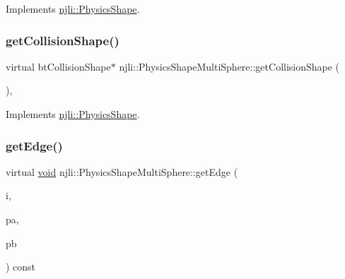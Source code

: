 Implements \mbox{\hyperlink{classnjli_1_1_physics_shape_a527e956caca24bf16ed0d47f69ff14e8}{njli\+::\+Physics\+Shape}}.

\mbox{\label{classnjli_1_1_physics_shape_multi_sphere_a591dec07102b432fbced1b4bfd093512}} 
\subsubsection{\texorpdfstring{get\+Collision\+Shape()}{getCollisionShape()}\hspace{0.1cm}{\footnotesize\ttfamily [2/2]}}
{\footnotesize\ttfamily virtual bt\+Collision\+Shape$\ast$ njli\+::\+Physics\+Shape\+Multi\+Sphere\+::get\+Collision\+Shape (\begin{DoxyParamCaption}{ }\end{DoxyParamCaption})\hspace{0.3cm}{\ttfamily [protected]}, {\ttfamily [virtual]}}



Implements \mbox{\hyperlink{classnjli_1_1_physics_shape_a2910f0362035c971f245349a55378b01}{njli\+::\+Physics\+Shape}}.

\mbox{\label{classnjli_1_1_physics_shape_multi_sphere_a4bf4fdd81dfddc61b0c40adf04bdddde}} 
\subsubsection{\texorpdfstring{get\+Edge()}{getEdge()}}
{\footnotesize\ttfamily virtual \mbox{\hyperlink{_thread_8h_af1e856da2e658414cb2456cb6f7ebc66}{void}} njli\+::\+Physics\+Shape\+Multi\+Sphere\+::get\+Edge (\begin{DoxyParamCaption}\item[{int}]{i,  }\item[{bt\+Vector3 \&}]{pa,  }\item[{bt\+Vector3 \&}]{pb }\end{DoxyParamCaption}) const\hspace{0.3cm}{\ttfamily [virtual]}}

